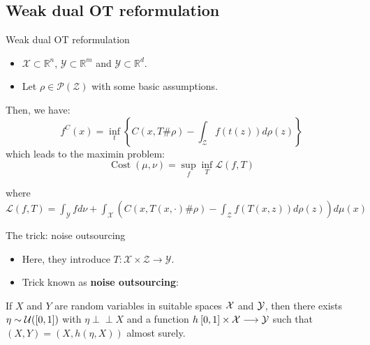 \documentclass{beamer}
\newcommand{\R}{\mathbb{R}}
\DeclareMathOperator*{\Cost}{\text{Cost}}
\newcommand{\indep}{\perp \!\!\! \perp}
\begin{document}
\subsection{Weak dual OT reformulation}
\begin{frame}{Weak dual OT reformulation}
    \begin{itemize}
        \item $\mathcal{X}\subset\R^n$, $\mathcal{Y}\subset\R^m$ and $\mathcal{Y}\subset\R^d$.
        \item Let $\rho\in \mathcal{P}(\mathcal{Z})$ with some basic assumptions.
    \end{itemize}
    Then, we have:
    \begin{equation}
        f^C(x)=\inf_t \left\{C(x, T\#\rho)-\int_{\mathcal{Z}}f(t(z))d\rho(z)\right\}
    \end{equation}
    which leads to the maximin problem:
    \begin{equation}
        \Cost(\mu,\nu) = \sup_{f} \inf_{T} \mathcal{L}(f,T)
    \end{equation}

    where
    $\mathcal{L}(f,T) = \int_{\mathcal{Y}}fd\nu + \int_{\mathcal{X}} \left( C(x, T(x,\cdot)\#\rho)-\int_{\mathcal{Z}}f(T(x,z))d\rho(z)\right)d\mu(x)$
\end{frame}

\begin{frame}{The trick: noise outsourcing}
    \begin{itemize}
        \item Here, they introduce $T:\mathcal{X}\times\mathcal{Z}\to\mathcal{Y}$.
        \item Trick known as \textbf{noise outsourcing}:
    \end{itemize}

    \begin{theorem}
        If $X$ and $Y$ are random variables in suitable spaces ${\cal X}$ and ${\cal Y}$, then there exists $\eta\sim {\cal U}([0,1])$ with $\eta \indep X$ and a function $h\: [0, 1]\times {\cal X} \longrightarrow {\cal Y}$ such that $(X, Y) = (X, h(\eta, X))$ almost surely.
    \end{theorem}
\end{frame}
\end{document}
